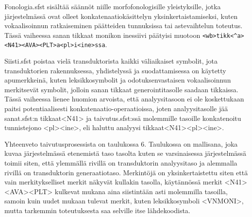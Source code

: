 \documentclass[free]{flammie}
\begin{document}
Fonologia.sfst sisältää säännöt niille morfofonologisille yleistyksille, jotka järjestelmässä ovat olleet konkatenaatiokäsittelyn yksinkertaistamiseksi, kuten vokaalisoinnun ratkaiseminen päätteiden tunnuksissa tai astevaihtelun toteutus. Tässä vaiheessa sanan tikkaat monikon inessiivi päätyisi muotoon
\verb|<wb>tikk<^a><N41><AVA><PLT>a<pl>i<ine>ssa|.

Siisti.sfst poistaa vielä transduktorista kaikki väliaikaiset symbolit, jota
transduktorien rakennuksessa, yhdistelyssä ja suodattamisessa on käytetty apumerkkeinä, kuten leksikkosymbolit ja odotuksenvastaisen vokaalisoinnun merkitsevät symbolit, jolloin sanan tikkaat generointitasolle saadaan tikkaissa.
Tässä vaiheessa lienee huomion arvoista, että analyysitasoon ei ole koskettukaan paitsi potentiaalisesti konkatenaatio-operaatioissa, joten analyysitasolle jää sanat.sfst:n tikkaat<N41> ja taivutus.sfst:ssä molemmille tasoille konkatenoitu tunnistejono <pl><ine>, eli haluttu analyysi
tikkaat<N41><pl><ine>.

Yhteenveto taivutusprosessista on taulukossa 6. Taulukossa on mallisana, joka
kuvaa järjestelmässä etenemistä taso tasolta kuten se varsinaisessa järjestelmässä toimii siten, että ylemmällä rivillä on transduktorin analyysitaso ja alemmalla rivillä on transduktorin generaatiotaso. Merkintöjä on yksinkertaistettu siten
että vain merkitykselliset merkit näkyvät kullakin tasolla, käytännössä merkit
<N41><AVA><PLT> kulkevat mukana aina siistintään asti molemmilla tasoilla, samoin kuin uudet mukaan tulevat merkit, kuten leksikkosymboli <VNMONI>,
mutta tarkemmin toteutuksesta saa selville itse lähdekoodista.
\end{document}
